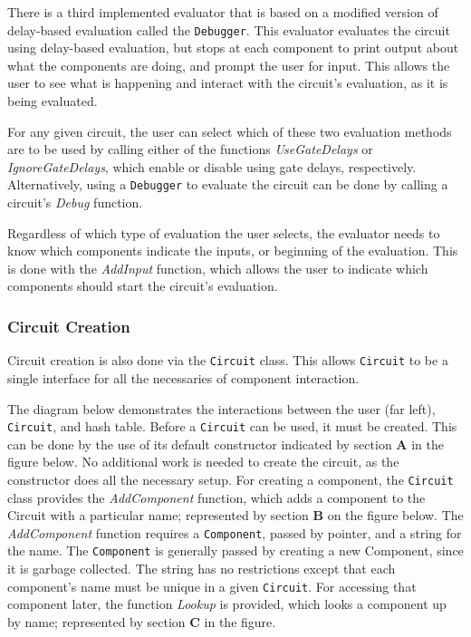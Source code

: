 \documentclass{article}
\newcommand{\Bold}[1]{\textbf{#1}}
\newcommand{\ClassName}[1]{\texttt{#1}}
\newcommand{\FunctionName}[1]{\textit{#1}}
\begin{document}
There is a third implemented evaluator that is based on a modified version of delay-based evaluation called the \ClassName{Debugger}. This evaluator evaluates the circuit using delay-based evaluation, but stops at each component to print output about what the components are doing, and prompt the user for input. This allows the user to see what is happening and interact with the circuit’s evaluation, as it is being evaluated.

For any given circuit, the user can select which of these two evaluation methods are to be used by calling either of the functions \FunctionName{UseGateDelays} or \FunctionName{IgnoreGateDelays}, which enable or disable using gate delays, respectively. Alternatively, using a \ClassName{Debugger} to evaluate the circuit can be done by calling a circuit’s \FunctionName{Debug} function.

Regardless of which type of evaluation the user selects, the evaluator needs to know which components indicate the inputs, or beginning of the evaluation. This is done with the \FunctionName{AddInput} function, which allows the user to indicate which components should start the circuit’s evaluation.

\subsubsection{Circuit Creation}

Circuit creation is also done via the \ClassName{Circuit} class. This allows \ClassName{Circuit} to be a single interface for all the necessaries of component interaction.

The diagram below demonstrates the interactions between the user (far left), \ClassName{Circuit}, and hash table. Before a \ClassName{Circuit} can be used, it must be created. This can be done by the use of its default constructor indicated by section \Bold{A} in the figure below. No additional work is needed to create the circuit, as the constructor does all the necessary setup. For creating a component, the \ClassName{Circuit} class provides the \FunctionName{AddComponent} function, which adds a component to the Circuit with a particular name; represented by section \Bold{B} on the figure below. The \FunctionName{AddComponent} function requires a \ClassName{Component}, passed by pointer, and a string for the name. The \ClassName{Component} is generally passed by creating a new Component, since it is garbage collected. The string has no restrictions except that each component’s name must be unique in a given \ClassName{Circuit}. For accessing that component later, the function \FunctionName{Lookup} is provided, which looks a component up by name; represented by section \Bold{C} in the figure.
\end{document}
